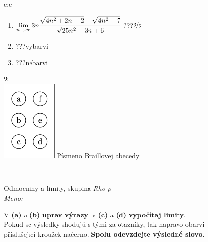\documentclass[10pt]{report}
\begin{document}
\begin{tabular}{c:c}
\begin{minipage}[c][104.5mm][t]{0.5\linewidth}
\begin{center}
\begin{minipage}{0.79\linewidth}
\begin{center}
\begin{varwidth}{\linewidth}
\begin{enumerate}
\item $\lim\limits_{n\to\infty}3n\cfrac{\sqrt{4n^2+2n-2}-\sqrt{4n^2+7}}{\sqrt{25n^2-3n+6}}$\quad \dotfill\; ???\;\dotfill \quad $\nicefrac{3}{5}$
\item \quad \dotfill\; ???\;\dotfill \quad vybarvi
\item \quad \dotfill\; ???\;\dotfill \quad nebarvi
\end{enumerate}
\end{varwidth}
\end{center}
\end{minipage}
\begin{minipage}{0.20\linewidth}
\begin{center}
{\Huge\bfseries 2.} \\[2mm]
\includegraphics[height=40mm]{../images/braille.png}
{\small Písmeno Braillovej abecedy}
\end{center}
\end{minipage}
\end{center}
\end{minipage}
\\ \hdashline
\begin{minipage}[c][104.5mm][t]{0.5\linewidth}
\begin{center}
\vspace{7mm}
{\huge Odmocniny a limity, skupina \textit{Rho $\rho$} -}\\[5mm]
\textit{Meno:}\phantom{xxxxxxxxxxxxxxxxxxxxxxxxxxxxxxxxxxxxxxxxxxxxxxxxxxxxxxxxxxxxxxxxx}\\[5mm]
\begin{minipage}{0.95\linewidth}
\begin{center}
V \textbf{(a)} a \textbf{(b)} \textbf{uprav výrazy}, v \textbf{(c)} a \textbf{(d)} \textbf{vypočítaj limity}.\\Pokud se výsledky shodujú s tými za otazníky, tak napravo obarvi\\příslušející kroužek načerno. \textbf{Spolu odevzdejte výsledné slovo}.
\end{center}
\end{minipage}
\\[1mm]

\end{center}
\end{minipage}
\end{tabular}
\end{document}
